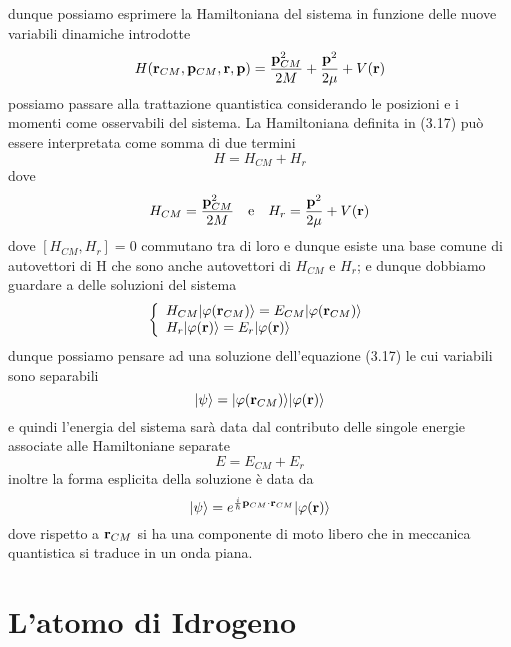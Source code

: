 dunque possiamo esprimere la Hamiltoniana del sistema in funzione delle nuove variabili dinamiche introdotte
\begin{equation}
	H(\bold{r}_{CM},\bold{p}_{CM},\bold{r},\bold{p}) = \frac{\bold{p}_{CM}^2}{2M} + \frac{\bold{p}^2}{2\mu} + V(\bold{r})
\end{equation}
possiamo passare alla trattazione quantistica considerando le posizioni e i momenti come osservabili del sistema. La Hamiltoniana definita in (3.17) pu\`o essere interpretata come somma di due termini 
\begin{equation*}
	H = H_{CM} + H_{r}
\end{equation*} 
dove 
\begin{equation*}
	H_{CM} = \frac{\bold{p}_{CM}^2}{2M} \quad \text{e} \quad H_r = \frac{\bold{p}^2}{2\mu} + V(\bold{r})
\end{equation*}
dove $[H_{CM},H_{r}] = 0$ commutano tra di loro e dunque esiste una base comune di autovettori di H che sono anche autovettori di $H_{CM}$ e $H_r$; e dunque dobbiamo guardare a delle soluzioni del sistema 
\begin{equation*}
	\left \{ \begin{array}{l}
	H_{CM} |\varphi(\bold{r}_{CM}) \rangle = E_{CM}|\varphi(\bold{r}_{CM}) \rangle  \\
	H_r |\varphi(\bold{r}) \rangle = E_r |\varphi(\bold{r}) \rangle 
	\end{array}\right.
\end{equation*}
dunque possiamo pensare ad una soluzione dell'equazione (3.17) le cui variabili sono separabili 
\begin{equation*}
	|\psi \rangle = | \varphi(\bold{r}_{CM})\rangle |\varphi(\bold{r}) \rangle
\end{equation*}
e quindi l'energia del sistema sar\`a data dal contributo delle singole energie associate alle Hamiltoniane separate 
\begin{equation*}
	E = E_{CM} + E_{r}
\end{equation*}
inoltre la forma esplicita della soluzione \`e data da 
\begin{equation*}
	|\psi \rangle = e^{\frac{i}{\hbar} \bold{p}_{CM} \cdot \bold{r}_{CM}}|\varphi(\bold{r}) \rangle  
\end{equation*}
dove rispetto a $\bold{r}_{CM}$ si ha una componente di moto libero che in meccanica quantistica si traduce in un onda piana.


\section{L'atomo di Idrogeno}

